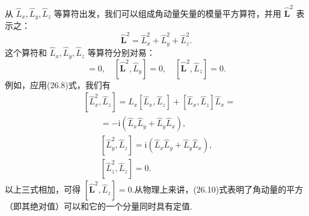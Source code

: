 从 $\hat{L}_x,\hat{L}_y,\hat{L}_z$ 等算符出发，我们可以组成角动量矢量的模量平方算符，并用 $\hat{\boldsymbol{L}}^2$ 表示之：
\begin{equation}
  \hat{\boldsymbol{L}}^2=\hat{L}_x^2+\hat{L}_y^2+\hat{L}_z^2.
\end{equation}
这个算符和 $\hat{L}_x,\hat{L}_y,\hat{L}_z$ 等算符分别对易：
\begin{equation}
  [\hat{\boldsymbol{L}}^2,\hat{L}_x]=0,\quad
  [\hat{\boldsymbol{L}}^2,\hat{L}_y]=0,\quad
  [\hat{\boldsymbol{L}}^2,\hat{L}_z]=0.
\end{equation}
例如，应用(26.8)式，我们有
\begin{equation*}
\begin{aligned}
  &[\hat{L}_x^2,\hat{L}_z]
  =\hat{L}_x[\hat{L}_x,\hat{L}_z]+[\hat{L}_x,\hat{L}_z]\hat{L}_x=\\
  &\qquad=-\mathrm{i}\left(\hat{L}_x\hat{L}_y+\hat{L}_y\hat{L}_x\right),\\
  &\qquad[\hat{L}_y^2,\hat{L}_z]
  =\mathrm{i}\left(\hat{L}_x\hat{L}_y+\hat{L}_y\hat{L}_x\right),\\
  &\qquad[\hat{L}_z^2,\hat{L}_z]=0.
\end{aligned}
\end{equation*}
以上三式相加，可得 $[\hat{\boldsymbol{L}}^2,\hat{L}_z]=0$.从物理上来讲，(26.10)式表明了角动量的平方（即其绝对值）可以和它的一个分量同时具有定值.

